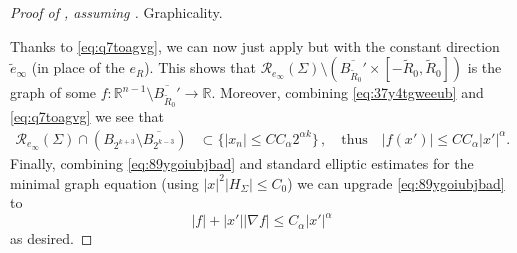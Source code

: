 \documentclass{article}
\newcommand{\R}{\mathbb{R}}
\theoremstyle{definition}
\begin{document}
\begin{proof}[Proof of , assuming ]
 Graphicality.

Thanks to \eqref{eq:q7toagvg}, we can now just apply  but with the constant direction $\widetilde e_\infty$ (in place of the $e_R$). This shows that $\mathcal R_{e_\infty}(\Sigma)\setminus \left(\overline{B_{\widetilde R_0}'}\times[-\widetilde R_0,\widetilde R_0]\right)$ is the graph of some $f:\R^{n-1}\setminus \overline{B_{\widetilde R_0}'}\to\R$. Moreover, combining \eqref{eq:37y4tgweeub} and \eqref{eq:q7toagvg} we see that
\begin{align}\label{eq:89ygoiubjbad}
    \mathcal R_{ e_\infty}(\Sigma) \cap (B_{2^{k+3}}\setminus \overline{B_{2^{k-3}}})&\subset \{|x_n|\leq CC_\alpha 2^{\alpha k}\}\,,\quad\mbox{thus}\quad |f(x')|\leq CC_\alpha |x'|^\alpha.
\end{align}
Finally, combining \eqref{eq:89ygoiubjbad} and standard elliptic estimates for the minimal graph equation (using $|x|^2|H_\Sigma|\leq C_0$) we can upgrade \eqref{eq:89ygoiubjbad} to
$$|f|+|x'||\nabla f|\leq C_\alpha|x'|^\alpha$$
as desired.
\end{proof}
\end{document}
